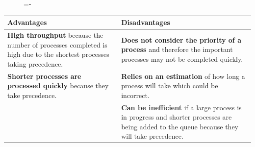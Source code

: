 \documentclass[a4paper]{systems-software}
\begin{document}
\begin{figure}[H]
  \lineskip=-\fboxrule
\end{figure}

\begin{longtabu} to \textwidth {|X[1,l]|X[1,l]|}
    \hline
    \textbf{Advantages} & \textbf{Disadvantages}
    \\ \hline
    \textbf{High throughput} because the number of processes completed is high due to the shortest processes taking precedence.
    &
    \textbf{Does not consider the priority of a process} and therefore the important processes may not be completed quickly.
    \\ \hline
  	\textbf{Shorter processes are processed quickly} because they take precedence.
    &
    \textbf{Relies on an estimation} of how long a process will take which could be incorrect.
    \\ \hline
  	
    &
    \textbf{Can be inefficient} if a large process is in progress and shorter processes are being added to the queue because they will take precedence.
	\\ \hline
\end{longtabu}
\end{document}
